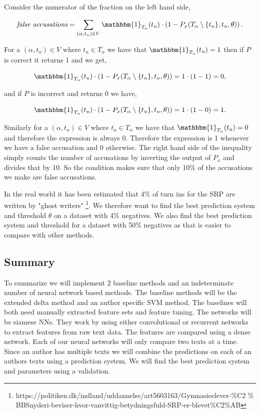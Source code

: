 Consider the numerator of the fraction on the left hand side,

\begin{equation}
    \textit{false accusations} = \sum_{(\alpha, t_u) \in V}
    \mathbbm{1}_{T_\alpha}(t_u) \cdot
    \left(1 - P_x(T_\alpha \setminus \{t_u\}, t_u, \theta)\right).
\end{equation}

For a $(\alpha, t_u) \in V$ where $t_u \in T_\alpha$ we have that
$\mathbbm{1}_{T_\alpha}(t_u) = 1$ then if $P$ is correct it returns 1 and we
get,

\begin{equation}
    \mathbbm{1}_{T_\alpha}(t_u) \cdot
    \left(1 - P_x(T_\alpha \setminus \{t_u\}, t_u, \theta)\right) =
    1 \cdot (1 - 1) = 0,
\end{equation}

and if $P$ is incorrect and returns 0 we have,

\begin{equation}
    \mathbbm{1}_{T_\alpha}(t_u) \cdot
    \left(1 - P_x(T_\alpha \setminus \{t_u\}, t_u, \theta)\right) =
    1 \cdot (1 - 0) = 1.
\end{equation}

Similarly for a $(\alpha, t_u) \in V$ where $t_u \in T_\alpha$ we have that
$\mathbbm{1}_{T_\alpha}(t_u) = 0$ and therefore the expression is always
0. Therefore the expression is 1 whenever we have a false accusation and 0
otherwise. The right hand side of the inequality simply counts the number of
accusations by inverting the output of $P_x$ and divides that by 10. So the
condition makes sure that only 10\% of the accusations we make are false
accusations.

In the real world it has been estimated that 4\% of turn
ins for the \gls{SRP} are written by "ghost writers"
\footnote{https://politiken.dk/indland/uddannelse/art5603163/Gymnasieelever-\%C2
\% BBSnyderi-beviser-hvor-vanvittig-betydningsfuld-SRP-er-blevet\%C2\%AB}. We
therefore want to find the best prediction system and threshold $\theta$ on a
dataset with 4\% negatives. We also find the best prediction system and
threshold for a dataset with 50\% negatives as that is easier to compare with
other methods.


\subsection{Summary}

To summarize we will implement 2 baseline methods and an indeterminate number of
neural network based methods. The baseline methods will be the extended delta
method and an author specific \gls{SVM} method. The baselines will both need
manually extracted feature sets and feature tuning. The networks will be siamese
\glspl{NN}. They work by using either convolutional or recurrent networks to
extract features from raw text data. The features are compared using a dense
network. Each of our neural networks will only compare two texts at a time.
Since an author has multiple texts we will combine the predictions on each of an
authors texts using a prediction system. We will find the best prediction system
and parameters using a validation.

